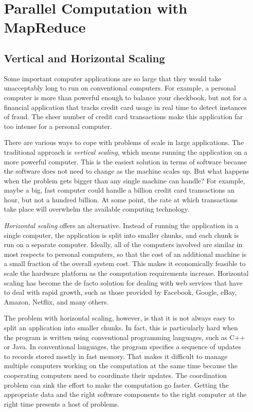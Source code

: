 \chapter{Parallel Computation with MapReduce}

\section{Vertical and Horizontal Scaling}

Some important computer applications are so large that they would take
unacceptably long to run on conventional computers.  For
example, a personal computer is more than powerful enough
to balance your checkbook, but not for a financial
application that tracks credit card usage in real time to
detect instances of fraud.  The sheer number of credit card
transactions make this application far too intense for a
personal computer.

There are various ways to cope
with problems of scale  in large applications.
The traditional approach is
\emph{vertical scaling},
which means running the
application on a more powerful computer.
This is the easiest solution in terms of software
because the software does not need to change as the machine scales up.
But what happens when the problem gets bigger than any single machine can handle?
For example, maybe a big, fast computer could handle
a billion credit card transactions an hour,
but not a hundred billion.
At some point, the rate at which transactions take place
will overwhelm the available computing technology.

\emph{Horizontal scaling}
offers an alternative.  Instead of
running the application in a single computer,
the application is split into smaller
chunks, and each chunk is run on a separate computer.
Ideally, all of the computers involved are similar in most respects
to personal computers, so that the cost of an additional
machine is a small fraction of the overall system cost.
This makes it economically feasible to scale the
hardware platform as the computation requirements increase.
Horizontal scaling has become the de facto
solution for dealing with web services that have to deal
with rapid growth, such as those provided by
Facebook, Google, eBay, Amazon, Netflix, and many others.

The problem with horizontal scaling, however, is that it is
not always easy to split an application into smaller
chunks.  In fact, this is particularly hard when the program
is written using conventional programming languages, such as
C++ or Java. In conventional languages, the program specifies
a sequence of updates to records stored mostly in fast memory.
That makes it difficult to manage multiple computers
working on the computation at the same time because the
cooperating computers need to coordinate their updates.
The coordination problem can sink the effort to make
the computation go faster.
Getting the appropriate data and the right software
components to the right computer
at the right time presents a host of problems.

